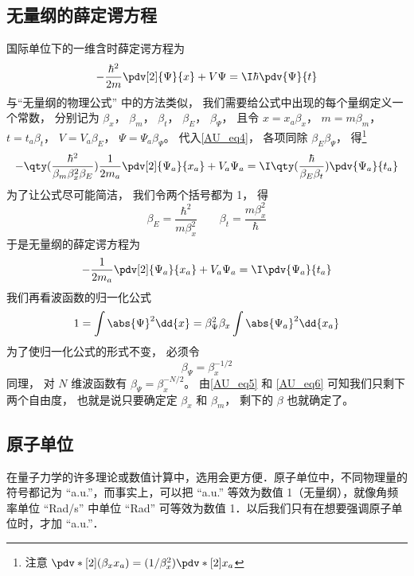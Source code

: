 

\subsection{无量纲的薛定谔方程}
国际单位下的一维含时薛定谔方程为
\begin{equation}\label{AU_eq4}
-\frac{\hbar^2}{2m} \pdv[2]{\Psi}{x} + V\Psi= \I\hbar \pdv{\Psi}{t}
\end{equation}
与“无量纲的物理公式” 中的方法类似， 我们需要给公式中出现的每个量纲定义一个常数， 分别记为 $\beta_x$， $\beta_m$， $\beta_t$， $\beta_E$， $\beta_\Psi$， 且令 $x = x_a\beta_x$， $m = m\beta_m$， $t = t_a\beta_t$， $V = V_a\beta_E$， $\Psi = \Psi_a \beta_\Psi$。
代入\autoref{AU_eq4}， 各项同除 $\beta_E\beta_\Psi$， 得\footnote{注意 $\pdv*[2]{(\beta_x x_a)} = (1/\beta_x^2) \pdv*[2]{x_a}$}
\begin{equation}
-\qty(\frac{\hbar^2}{\beta_m\beta_x^2\beta_E})\frac{1}{2m_a} \pdv[2]{\Psi_a}{x_a} + V_a\Psi_a= \I\qty(\frac{\hbar}{\beta_E\beta_t})\pdv{\Psi_a}{t_a}
\end{equation}
为了让公式尽可能简洁， 我们令两个括号都为 1， 得
\begin{equation}\label{AU_eq6}
\beta_E = \frac{\hbar^2}{m\beta_x^2}
\qquad
\beta_t = \frac{m\beta_x^2}{\hbar}
\end{equation}
于是无量纲的薛定谔方程为
\begin{equation}
-\frac{1}{2m_a} \pdv[2]{\Psi_a}{x_a} + V_a\Psi_a= \I\pdv{\Psi_a}{t_a}
\end{equation}
我们再看波函数的归一化公式
\begin{equation}
1 = \int \abs{\Psi}^2 \dd{x} = \beta_\Psi^2 \beta_x \int \abs{\Psi_a}^2 \dd{x_a}
\end{equation}
为了使归一化公式的形式不变， 必须令
\begin{equation}\label{AU_eq5}
\beta_\Psi = \beta_x^{-1/2}
\end{equation}
同理， 对 $N$ 维波函数有 $\beta_\Psi = \beta_x^{-N/2}$。
由\autoref{AU_eq5} 和 \autoref{AU_eq6} 可知我们只剩下两个自由度， 也就是说只要确定定 $\beta_x$ 和 $\beta_m$， 剩下的 $\beta$ 也就确定了。

\subsection{原子单位}

在量子力学的许多理论或数值计算中，选用会更方便．原子单位中，不同物理量的符号都记为 “a.u.”，而事实上，可以把 “a.u.” 等效为数值 1（无量纲），就像角频率单位 “Rad/s” 中单位 “Rad” 可等效为数值 1．以后我们只有在想要强调原子单位时，才加 “a.u.”．

